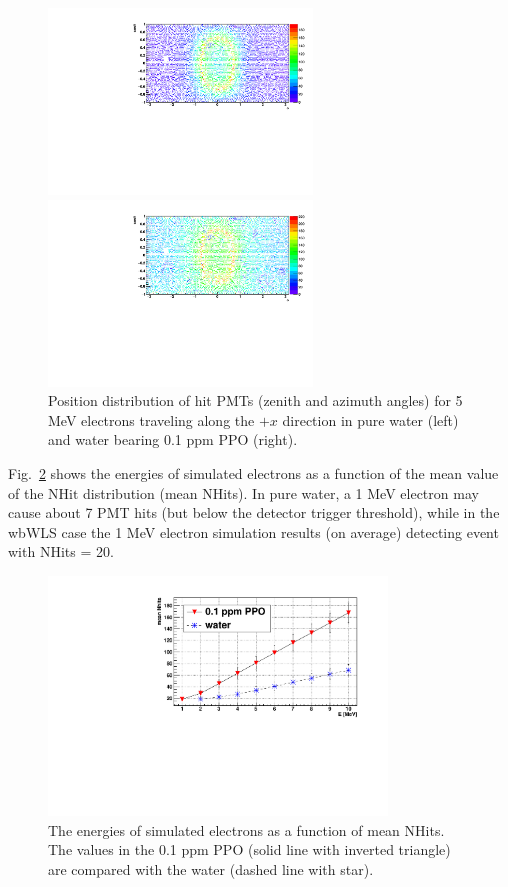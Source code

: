 \begin{figure}[htbp]
	\centering
	\begin{minipage}[t]{0.48\textwidth}
		\centering
		\includegraphics[width=7cm]{PMT_5MeVElectronWater.pdf}
	\end{minipage}
	\begin{minipage}[t]{0.48\textwidth}
		\centering
		\includegraphics[width=7cm]{PMT_5MeVElectron0p1ppmPPO.pdf}
	\end{minipage}
	\caption[Position distribution of hit PMTs (zenith and azimuth angles).]{Position distribution of hit PMTs (zenith and azimuth angles) for 5 MeV electrons traveling along the $+x$ direction in pure water (left) and water bearing 0.1 ppm PPO (right).\label{pmt_wls}}	
\end{figure}

Fig.~\ref{nhit_wls} shows the energies of simulated electrons as a function of the mean value of the $\mathrm{NHit}$ distribution (mean NHits). In pure water, a 1 MeV electron may cause about 7 PMT hits (but below the detector trigger threshold), while in the wbWLS case the 1 MeV electron simulation results (on average) detecting event with NHits = 20.

\begin{figure}[htbp]
	\centering	
	\includegraphics[width=9cm]{nhits_wls.pdf}
	\caption[The energies of simulated electrons as a function of mean NHits.]{The energies of simulated electrons as a function of mean NHits. The values in the 0.1 ppm PPO (solid line with inverted triangle) are compared with the water (dashed line with star).	\label{nhit_wls}}
\end{figure}

